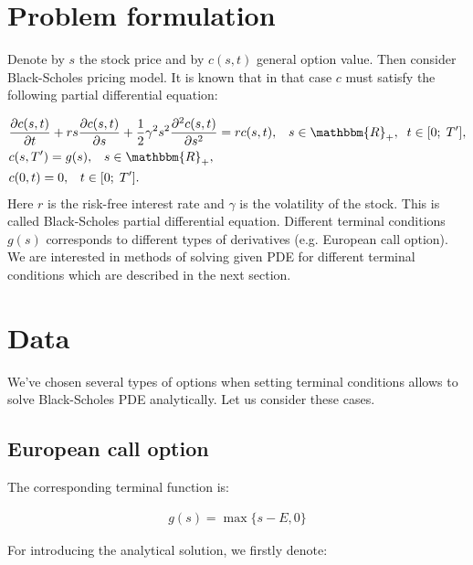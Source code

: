 \documentclass[11pt,a4paper]{extarticle}
\begin{document}
\section{Problem formulation}

Denote by $s$ the stock price and by $c(s,t)$ general option value. Then consider Black-Scholes pricing model. It is known that in that case $c$ must satisfy the following partial differential equation:

\begin{equation}
	\begin{aligned}
		&\frac{\partial c(s,t)}{\partial t} + rs \frac{\partial c(s,t)}{\partial s} + \frac12 \gamma^2 s^2 \frac{\partial^2 c(s,t)}{\partial s^2} = rc(s,t),
		\;\;\;s \in \mathbbm{R}_{+},\;\; t \in [0;\;T^{\prime}],\\
		&c(s,T^{\prime}) = g(s), \;\;\; s \in \mathbbm{R}_{+},\\
		&c(0,t) = 0, \;\;\; t \in [0;\;T^{\prime}].
	\end{aligned}
\end{equation}
Here  $r$ is the risk-free interest rate and $\gamma$ is the volatility of the stock.
This is called Black-Scholes partial differential equation. Different terminal conditions $g(s)$ corresponds to different types of derivatives (e.g. European call option). We are interested in methods of solving given PDE for different terminal conditions which are described in the next section.

\section{Data}

We've chosen several types of options when setting terminal conditions allows to solve Black-Scholes PDE analytically. Let us consider these cases.

\subsection{European call option}

The corresponding terminal function is:

\begin{equation}
    \begin{aligned}
    g(s)=\max\{s-E, 0\}
    \end{aligned}
    \end{equation}

For introducing the analytical solution, we firstly denote:
\end{document}
